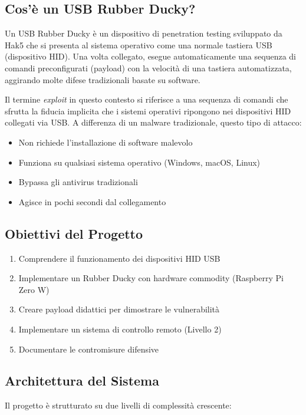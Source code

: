 \documentclass[12pt,a4paper]{article}
\begin{document}
\subsection{Cos'è un USB Rubber Ducky?}
Un USB Rubber Ducky è un dispositivo di penetration testing sviluppato da Hak5 che si presenta
al sistema operativo come una normale tastiera USB (dispositivo HID). Una volta collegato,
esegue automaticamente una sequenza di comandi preconfigurati (payload) con la velocità
di una tastiera automatizzata, aggirando molte difese tradizionali basate su software.

Il termine \textit{exploit} in questo contesto si riferisce a una sequenza di comandi che
sfrutta la fiducia implicita che i sistemi operativi ripongono nei dispositivi HID collegati
via USB. A differenza di un malware tradizionale, questo tipo di attacco:

\begin{itemize}
    \item Non richiede l'installazione di software malevolo
    \item Funziona su qualsiasi sistema operativo (Windows, macOS, Linux)
    \item Bypassa gli antivirus tradizionali
    \item Agisce in pochi secondi dal collegamento
\end{itemize}

\subsection{Obiettivi del Progetto}
\begin{enumerate}
    \item Comprendere il funzionamento dei dispositivi HID USB
    \item Implementare un Rubber Ducky con hardware commodity (Raspberry Pi Zero W)
    \item Creare payload didattici per dimostrare le vulnerabilità
    \item Implementare un sistema di controllo remoto (Livello 2)
    \item Documentare le contromisure difensive
\end{enumerate}

\subsection{Architettura del Sistema}
Il progetto è strutturato su due livelli di complessità crescente:
\end{document}
